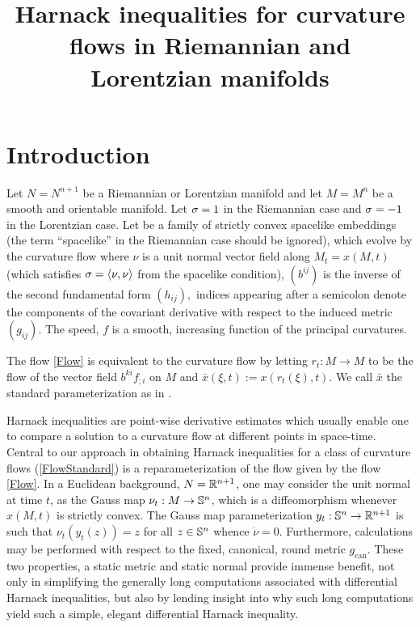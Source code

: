 
\usepackage{mathrsfs}



\title[Harnack inequalities for curvature flows]{Harnack inequalities for curvature flows in Riemannian and Lorentzian manifolds}

\maketitle
\section{Introduction}
\label{sec:intro}
Let $N=N^{n+1}$ be a Riemannian or Lorentzian manifold and let $M=M^{n}$ be a smooth and orientable manifold. Let $\s = 1$ in the Riemannian case and $\s = -1$ in the Lorentzian case. Let
\eq{x\cn M\x[0,T^{\ast})\ra N}
be a family of strictly convex spacelike embeddings (the term ``spacelike'' in the Riemannian case should be ignored), which evolve by the curvature flow
where $\nu$ is a unit normal vector field along $M_{t}=x(M,t)$ (which satisfies $\s=\ip{\nu}{\nu}$ from the spacelike condition), $(b^{ij})$ is the inverse of the second fundamental form $(h_{ij}),$ indices appearing after a semicolon denote the components of the covariant derivative with respect to the induced metric $(g_{ij})$. The speed, $f$ is a smooth, increasing function of the principal curvatures.

The flow \eqref{Flow} is equivalent to the curvature flow
\eq{\label{FlowStandard}
\bar{x}&:M\times [0,T^{\ast})\to N\\
\dot{\bar{x}} &= -\s \bar{f} \bar{\nu}.}
by letting \(r_t:M\to M\) to be the flow of the vector field $b^{ki}f_{;i}$ on $M$ and  $\bar{x} (\xi, t) := x (r_t(\xi), t)$. We call $\bar{x}$  the standard parameterization as in \cite{Andrews:09/1994}.

Harnack inequalities are point-wise derivative estimates which usually enable one to compare a solution to a curvature flow at different points in space-time.
Central to our approach in obtaining Harnack inequalities for a class of curvature flows (\ref{FlowStandard}) is a reparameterization of the flow given by the flow \eqref{Flow}. 
In a Euclidean background, $N = \R^{n+1}$, one may consider the unit normal at time $t$, as the Gauss map $\nu_t : M \to \S^n$, which is a diffeomorphism whenever $x(M,t)$ is strictly convex. The Gauss map parameterization $y_t: \S^n \to \R^{n+1}$ \cite{Andrews:09/1994} is such that $\nu_t(y_t(z)) = z$ for all $z \in \S^n$ whence $\dot{\nu} = 0$. Furthermore, calculations may be performed with respect to the fixed, canonical, round metric $g_{\operatorname{can}}$. These two properties, a static metric and static normal provide immense benefit, not only in simplifying the generally long computations associated with differential Harnack inequalities, but also by lending insight into why such long computations yield such a simple, elegant differential Harnack inequality.

